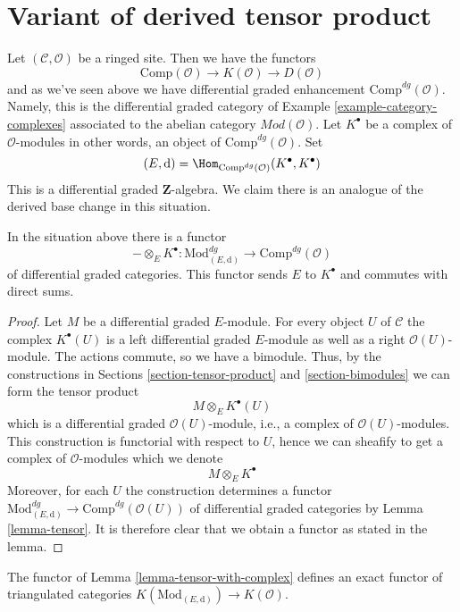 \section{Variant of derived tensor product}
\label{section-variant-base-change}

\noindent
Let $(\mathcal{C}, \mathcal{O})$ be a ringed site. Then we have the functors
$$
\text{Comp}(\mathcal{O}) \to K(\mathcal{O}) \to D(\mathcal{O})
$$
and as we've seen above we have differential graded enhancement
$\text{Comp}^{dg}(\mathcal{O})$. Namely, this is the differential
graded category of Example \ref{example-category-complexes} associated
to the abelian category $\textit{Mod}(\mathcal{O})$.
Let $K^\bullet$ be a complex of $\mathcal{O}$-modules in other
words, an object of $\text{Comp}^{dg}(\mathcal{O})$. Set
$$
(E, \text{d}) =
\Hom_{\text{Comp}^{dg}(\mathcal{O})}(K^\bullet, K^\bullet)
$$
This is a differential graded $\mathbf{Z}$-algebra. We claim there is
an analogue of the derived base change in this situation.

\begin{lemma}
\label{lemma-tensor-with-complex}
In the situation above there is a functor
$$
- \otimes_E K^\bullet :
\text{Mod}^{dg}_{(E, \text{d})}
\longrightarrow
\text{Comp}^{dg}(\mathcal{O})
$$
of differential graded categories. This functor sends $E$ to $K^\bullet$
and commutes with direct sums.
\end{lemma}

\begin{proof}
Let $M$ be a differential graded $E$-module. For every object $U$ of
$\mathcal{C}$ the complex $K^\bullet(U)$ is a left differential
graded $E$-module as well as a right $\mathcal{O}(U)$-module.
The actions commute, so we have a bimodule.
Thus, by the constructions in
Sections \ref{section-tensor-product} and \ref{section-bimodules}
we can form the tensor product
$$
M \otimes_E K^\bullet(U)
$$
which is a differential graded $\mathcal{O}(U)$-module, i.e., a complex
of $\mathcal{O}(U)$-modules. This construction is functorial with respect
to $U$, hence we can sheafify to get a complex of $\mathcal{O}$-modules
which we denote
$$
M \otimes_E K^\bullet
$$
Moreover, for each $U$ the construction determines a functor
$\text{Mod}^{dg}_{(E, \text{d})} \to \text{Comp}^{dg}(\mathcal{O}(U))$
of differential graded categories by Lemma \ref{lemma-tensor}.
It is therefore clear that we obtain a functor as stated in the lemma.
\end{proof}

\begin{lemma}
\label{lemma-tensor-with-complex-homotopy}
The functor of Lemma \ref{lemma-tensor-with-complex} defines an exact functor
of triangulated categories
$K(\text{Mod}_{(E, \text{d})}) \to K(\mathcal{O})$.
\end{lemma}

